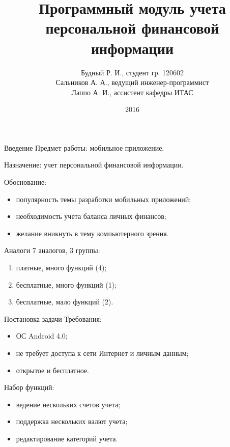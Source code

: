 \documentclass[hyperref={pdftex,unicode}]{beamer}
\title{Программный модуль учета персональной финансовой информации}
\author{%
  Будный Р. И., студент гр. 120602 \\
  Сальников А. А., ведущий инженер-программист \\
  Лаппо А. И., ассистент кафедры ИТАС
}
\date{2016}
\begin{document}
\begin{frame}
  \maketitle
\end{frame}

\begin{frame}{Введение}
  Предмет работы: мобильное приложение.

  \smallskip
  Назначение: учет персональной финансовой информации.

  \smallskip
  Обоснование:
  \begin{itemize}
  \item популярность темы разработки мобильных приложений;
  \item необходимость учета баланса личных финансов;
  \item желание вникнуть в тему компьютерного зрения.
  \end{itemize}
\end{frame}

\begin{frame}{Аналоги}
  7 аналогов, 3 группы:
  \begin{enumerate}
    \item платные, много функций (4);
    \item бесплатные, много функций (1);
    \item бесплатные, мало функций (2).
  \end{enumerate}
\end{frame}

\begin{frame}{Постановка задачи}
  Требования:
  \begin{itemize}
    \item ОС Android 4.0;
    \item не требует доступа к сети Интернет и личным данным;
    \item открытое и бесплатное.
  \end{itemize}

  \smallskip
  Набор функций:
  \begin{itemize}
  \item ведение нескольких счетов учета;
  \item поддержка нескольких валют учета;
  \item редактирование категорий учета.
  \end{itemize}
\end{frame}
\end{document}
